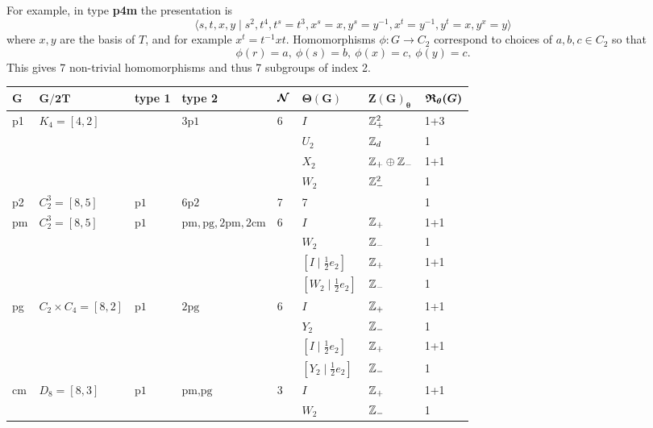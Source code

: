 For example, in type {\bfseries p4m} the presentation is
\[
\langle s,t,x,y \mid
    s^2,
    t^4,
    t^s = t^3,
    x^s = x,
    y^s = y^{-1},
    x^t = y^{-1},
    y^t = x,
    y^x = y
\rangle
\]
where $x,y$ are the basis of $T$, and for example $x^t = t^{-1} x t$. Homomorphisms $\phi: G \to C_2$ correspond to choices of $a,b,c\in C_2$ so that
\[ \phi (r) = a, \ \phi (s) = b, \ \phi (x) = c, \ \phi (y) = c. \] 
This gives 7 non-trivial homomorphisms and thus 7 subgroups of index 2.

\begin{table}[!htbp]
\centering
\small
\begin{tabular}{llll|llll}
\toprule
 $\boldsymbol{G}$ &  $\boldsymbol{G/2T}$ &  type 1  & type 2 & $\boldsymbol{{\mathcal N}}$ & $\boldsymbol{\Theta(G)}$ & $\boldsymbol{Z(G)_{\theta}}$ & $\boldsymbol{{\mathfrak R}_{\theta}(G)}$ \\
\midrule
p1   & $K_4 = [4,2]$       &      &  $3\mbox{p1}$ & 6  & $I$  & ${\mathbb Z}^2_{+}$ & 1+3 \\
&       &      &   &   & $U_2$  & ${\mathbb Z}_{d}$  & 1 \\
&       &      &   &   & $X_2$  & ${\mathbb Z}_{+}\oplus {\mathbb Z}_{-}$  &  1+1 \\
&       &      &   &   & $W_2$  & ${\mathbb Z}^2_{-}$  & 1 \\
\midrule
p2   & $C_2^3 = [8,5]$    & $\mbox{p1}$  & $6\mbox{p2}$  &  7  &  7 & &  1 \\
\midrule
pm   & $C_2^3 = [8,5]$     &  $\mbox{p1}$ & $\mbox{pm},\mbox{pg},2\mbox{pm},2\mbox{cm}$ & 6  & $I$ & ${\mathbb Z}_{+}$  & 1+1 \\
&       &      &   &   & $W_2$  & ${\mathbb Z}_{-}$  & 1 \\
&       &      &   &   & $[I \mid\tfrac12 e_2]$  & ${\mathbb Z}_{+}$  & 1+1 \\
&       &      &   &   & $[W_2 \mid\tfrac12 e_2]$  & ${\mathbb Z}_{-}$  & 1 \\
\midrule
pg   & $C_2\times C_4 = [8,2]$     & $\mbox{p1}$  & $2\mbox{pg}$ & 6 &  $I$ & ${\mathbb Z}_{+}$  & 1+1 \\
&       &      &   &   & $Y_2$  & ${\mathbb Z}_{-}$  & 1 \\
&       &      &   &   & $[I \mid\tfrac12 e_2]$  & ${\mathbb Z}_{+}$  & 1+1 \\
&       &      &   &   & $[Y_2 \mid\tfrac12 e_2]$  & ${\mathbb Z}_{-}$  & 1 \\
\midrule
cm   & $D_8 = [8,3]$    & $\mbox{p1}$  & $\mbox{pm}, \mbox{pg}$  & 3  & $I$ & ${\mathbb Z}_{+}$  & 1+1 \\
&       &      &   &   & $W_2$  & ${\mathbb Z}_{-}$  & 1 \\

\end{tabular}
\end{table}
